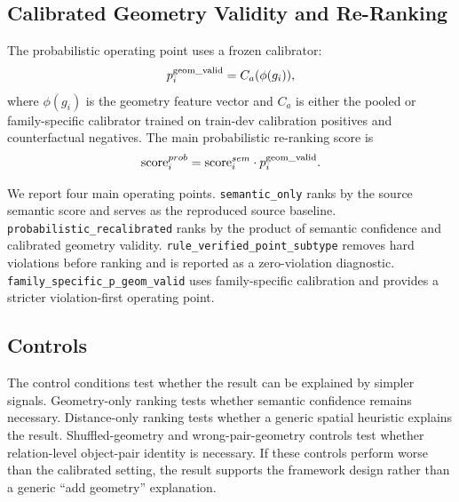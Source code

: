 \subsection{Calibrated Geometry Validity and Re-Ranking}

The probabilistic operating point uses a frozen calibrator:
\begin{equation}
p^{\mathrm{geom\_valid}}_i = C_a(\phi(g_i)),
\end{equation}
where $\phi(g_i)$ is the geometry feature vector and $C_a$ is either the pooled
or family-specific calibrator trained on train-dev calibration positives and
counterfactual negatives. The main probabilistic re-ranking score is
\begin{equation}
\mathrm{score}^{prob}_i = \mathrm{score}^{sem}_i \cdot p^{\mathrm{geom\_valid}}_i.
\end{equation}

We report four main operating points. \texttt{semantic\_only} ranks by the
source semantic score and serves as the reproduced source baseline.
\texttt{probabilistic\_recalibrated} ranks by the product of semantic
confidence and calibrated geometry validity.
\texttt{rule\_verified\_point\_subtype} removes hard violations before ranking
and is reported as a zero-violation diagnostic.
\texttt{family\_specific\_p\_geom\_valid} uses family-specific calibration and
provides a stricter violation-first operating point.

\subsection{Controls}

The control conditions test whether the result can be explained by simpler
signals. Geometry-only ranking tests whether semantic confidence remains
necessary. Distance-only ranking tests whether a generic spatial heuristic
explains the result. Shuffled-geometry and wrong-pair-geometry controls test
whether relation-level object-pair identity is necessary. If these controls
perform worse than the calibrated setting, the result supports the framework
design rather than a generic ``add geometry'' explanation.

